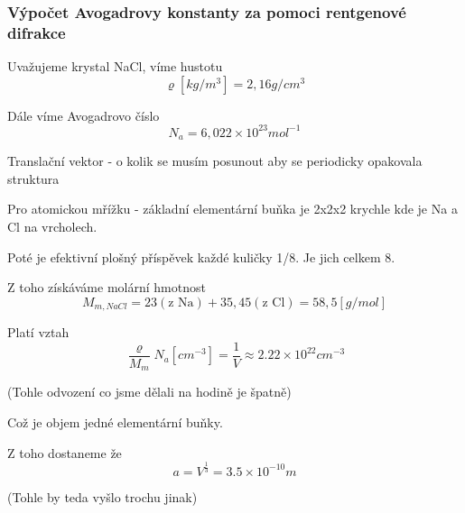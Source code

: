 \documentclass[../main.tex]{subfiles}
\begin{document}
\subsubsection{Výpočet Avogadrovy konstanty za pomoci rentgenové difrakce}

Uvažujeme krystal NaCl, víme hustotu
\begin{equation}
    \varrho [kg/m^3] = 2,16 g/cm^3 
\end{equation}

Dále víme Avogadrovo číslo
\begin{equation}
    N_a = 6,022 \times 10^{23} mol^{-1}
\end{equation}




Translační vektor - o kolik se musím posunout aby se periodicky opakovala struktura

Pro atomickou mřížku - základní elementární buňka je 2x2x2 krychle kde je Na a Cl na vrcholech.

Poté je efektivní plošný příspěvek každé kuličky 1/8. Je jich celkem 8.

Z toho získáváme molární hmotnost
\begin{equation}
    M_{m, NaCl} = 23 (\text{z Na}) + 35,45 (\text{z Cl}) = 58,5 [g/mol]
\end{equation}


Platí vztah
\begin{equation}
    \frac{\varrho}{M_m} N_a [cm^{-3}] = \frac{1}{V}  \approx 2.22 \times 10^{22} cm^{-3}
\end{equation}

(Tohle odvození co jsme dělali na hodině je špatně)

Což je objem jedné elementární buňky. 

Z toho dostaneme že
\begin{equation}
    a = V^{\frac{1}{3}} = 3.5 \times10^{-10} m
\end{equation}

(Tohle by teda vyšlo trochu jinak)
\end{document}
